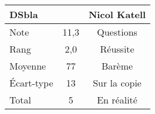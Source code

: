 \documentclass[a4paper]{article}
\begin{document}
\begin{tabular}{|l|c|c|}
\hline
\multicolumn{2}{l}{DSbla} & Nicol Katell \\
\hline
Note        & 11,3  & Questions \\
\hline
Rang     & 2,0   & Réussite \\
\hline
Moyenne & 77    & Barème \\
\hline
\'Ecart-type         & 13    & Sur la copie \\
\hline
Total         & 5     & En réalité\\
\hline
\end{tabular}
\end{document}
